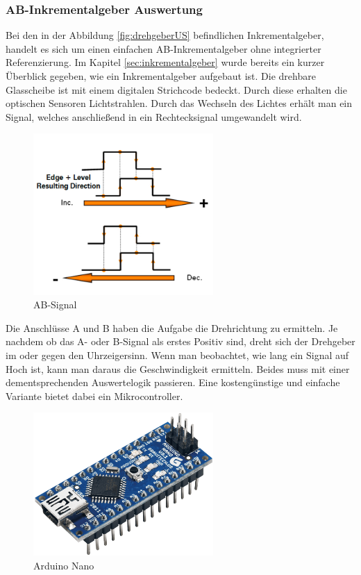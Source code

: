 \subsubsection{AB-Inkrementalgeber Auswertung}
\label{sec:auswertungInkrementalgeber}

Bei den in der Abbildung \ref{fig:drehgeberUS} befindlichen Inkrementalgeber, handelt es sich um einen einfachen AB-Inkrementalgeber ohne integrierter Referenzierung. Im Kapitel \ref{sec:inkrementalgeber} wurde bereits ein kurzer Überblick gegeben, wie ein Inkrementalgeber aufgebaut ist. Die drehbare Glasscheibe ist mit einem digitalen Strichcode bedeckt. Durch diese erhalten die optischen Sensoren Lichtstrahlen. Durch das Wechseln des Lichtes erhält man ein Signal, welches anschließend in ein Rechtecksignal umgewandelt wird. 

\begin{figure}[H]
\begin{center}
	\caption{AB-Signal}
	\includegraphics[width=0.61\textwidth]{fig/ABSignal}
\end{center}
\end{figure}

Die Anschlüsse A und B haben die Aufgabe die Drehrichtung zu ermitteln. Je nachdem ob das A- oder B-Signal als erstes Positiv sind, dreht sich der Drehgeber im oder gegen den Uhrzeigersinn. Wenn man beobachtet, wie lang ein Signal auf Hoch ist, kann man daraus die Geschwindigkeit ermitteln. Beides muss mit einer dementsprechenden Auswertelogik passieren. Eine kostengünstige und einfache Variante bietet dabei ein Mikrocontroller. 

\begin{figure}[H]
\begin{center}
	\includegraphics[width=0.61\textwidth]{fig/nano}
	\caption{Arduino Nano}
\end{center}
\end{figure}

